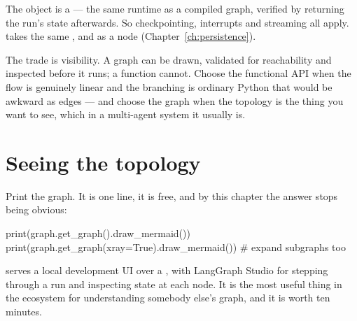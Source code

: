 The object is a  --- the same runtime as a compiled graph, verified by
 returning the run's state afterwards. So checkpointing,
interrupts and streaming all apply.  takes the same
,  and  as a node
(Chapter~\ref{ch:persistence}).

\begin{note}
The trade is visibility. A graph can be drawn, validated for reachability and
inspected before it runs; a function cannot. Choose the functional API when the
flow is genuinely linear and the branching is ordinary Python that would be
awkward as edges --- and choose the graph when the topology is the thing you want
to see, which in a multi-agent system it usually is.
\end{note}

\section{Seeing the topology}
\label{sec:visualisation}

Print the graph. It is one line, it is free, and by this chapter the answer stops
being obvious:

\begin{python}[caption={The topology, from the running code}, label={lst:draw}]
print(graph.get_graph().draw_mermaid())
print(graph.get_graph(xray=True).draw_mermaid())   # expand subgraphs too
\end{python}

 serves a local development UI over a ,
with LangGraph Studio for stepping through a run and inspecting state at each
node. It is the most useful thing in the ecosystem for understanding somebody
else's graph, and it is worth ten minutes.


